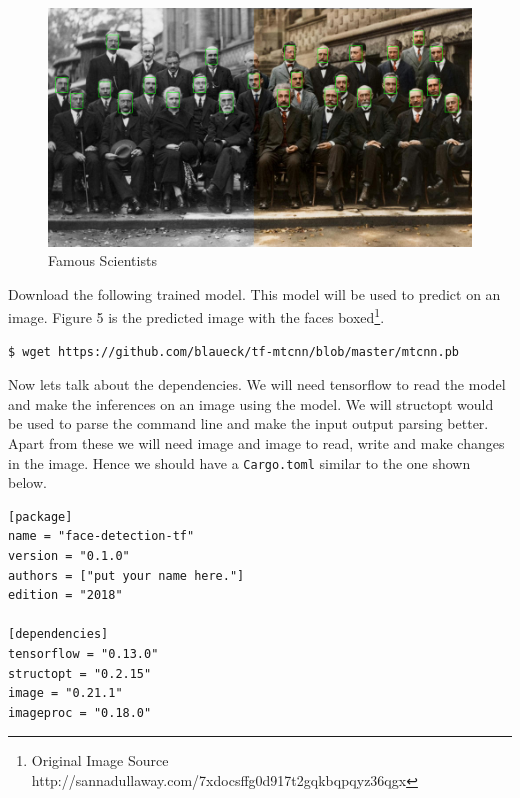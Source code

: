\documentclass{book}
\begin{document}
\begin{figure}
\begin{center}
	\includegraphics[scale=0.2]{Figures/scientists.jpg}
\end{center}
\caption{Famous Scientists}
\label{fig:}
\end{figure}

Download the following trained model. This model will be used to predict on an image. Figure 5 is the predicted image with the faces boxed\footnote{Original Image Source http://sannadullaway.com/7xdocsffg0d917t2gqkbqpqyz36qgx}.

\begin{lstlisting}[caption={}, basicstyle=\small]
$ wget https://github.com/blaueck/tf-mtcnn/blob/master/mtcnn.pb
\end{lstlisting}

Now lets talk about the dependencies. We will need tensorflow to read the model and make the inferences on an image using the model. We will structopt would be used to parse the command line and make the input output parsing better. Apart from these we will need image and image to read, write and make changes in the image. Hence we should have a \lstinline{Cargo.toml} similar to the one shown below.

\begin{lstlisting}[caption={chapter6/face-detection-tf/src/main.rs}, basicstyle=\small]
[package]
name = "face-detection-tf"
version = "0.1.0"
authors = ["put your name here."]
edition = "2018"

[dependencies]
tensorflow = "0.13.0"
structopt = "0.2.15"
image = "0.21.1"
imageproc = "0.18.0"
\end{lstlisting}
\end{document}
